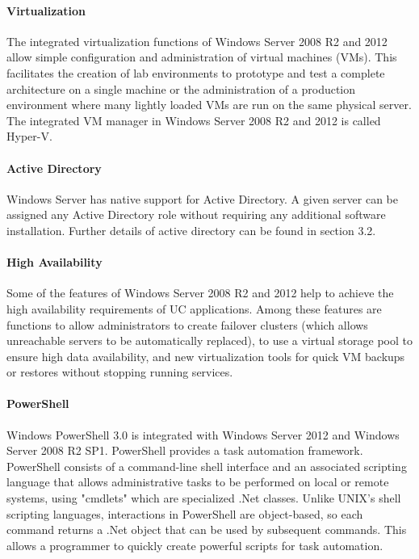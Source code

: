 \paragraph{Virtualization}
The integrated virtualization functions of Windows Server 2008 R2 and 2012 allow simple configuration and administration of virtual machines (VMs). This facilitates the creation of lab environments to prototype and test a complete architecture on a single machine or the administration of a production environment where many lightly loaded VMs are run on the same physical server. The integrated VM manager in Windows Server 2008 R2 and 2012 is called Hyper-V.

\paragraph{Active Directory}
Windows Server has native support for Active Directory. A given server can be assigned any Active Directory role without requiring any additional software installation. Further details of active directory can be found in section 3.2.

\paragraph{High Availability}
Some of the features of Windows Server 2008 R2 and 2012 help to achieve the high availability requirements of UC applications. Among these features are functions to allow administrators to create failover clusters (which allows unreachable servers to be automatically replaced), to use a virtual storage pool to ensure high data availability, and new virtualization tools for quick VM backups or restores without stopping running services.

\paragraph{PowerShell}
Windows PowerShell 3.0 is integrated with Windows Server 2012 and Windows Server 2008 R2 SP1. PowerShell provides a task automation framework. PowerShell consists of a command-line shell interface and an associated scripting language that allows administrative tasks to be performed on local or remote systems, using "cmdlets" which are specialized .Net classes. Unlike UNIX's shell scripting languages, interactions in PowerShell are object-based, so each command returns a .Net object that can be used by subsequent commands. This allows a programmer to quickly create powerful scripts for task automation.



